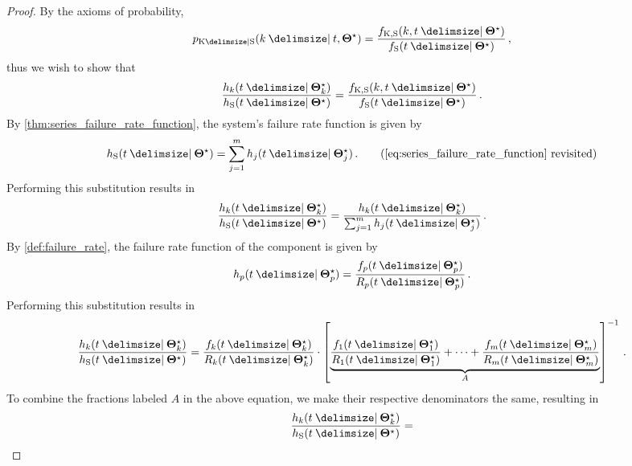 \documentclass[
    11pt,
    extrafontsizes,
    article,
    oldfontcommands,
    final,
    oneside,
    openany,
    hidelinks]{memoir}
\begin{document}
\begin{proof}
By the axioms of probability,
\begin{equation}
    \pmf_{\RV{K} \Given \sv}(k \Given t, \tparam\sysparam) =
    \frac { \pdf_{\RV{K}, \sv}(k, t \Given \tparam{\sysparam}) }
    { \spdf(t \Given \tparam{\sysparam}) }\,,
\end{equation}
thus we wish to show that
\begin{equation}
\label{eq:proof_cor_K_given_S_failure_rate}
    \frac{\haz_k(t \Given \tparam{\sysparam}_k)}{\haz_{\sv}(t \Given \tparam{\sysparam})} =
    \frac   { \pdf_{\RV{K}, \sv}(k, t \Given \tparam{\sysparam}) }
            { \spdf(t \Given \tparam{\sysparam}) }\,.
\end{equation}
By \cref{thm:series_failure_rate_function}, the system's failure rate function is given by
\begin{equation*}
\haz_{\sv}(t \Given \tparam\sysparam) = \sum_{j=1}^{m} \haz_j(t \Given \tparam{\sysparam}_j)\,.
\tag{\ref{eq:series_failure_rate_function} revisited}
\end{equation*}
Performing this substitution results in
\begin{equation}
    \frac{\haz_k(t \Given \tparam{\sysparam}_k)}{\haz_{\sv}(t \Given \tparam{\sysparam})} = \frac{\haz_k(t \Given \tparam{\sysparam}_k)}{\sum_{j=1}^{m} \haz_j(t \Given \tparam{\sysparam}_j) }\,.
\end{equation}
By \cref{def:failure_rate}, the failure rate function of the \pth component is given by
\begin{equation}
    \haz_p(t \Given \tparam{\sysparam}_p) = \frac{\pdf_p(t \Given \tparam{\sysparam}_p)}{\srv_p(t \Given \tparam{\sysparam}_p)}\,.
\end{equation}
Performing this substitution results in
\begin{equation}
    \frac{\haz_k(t \Given \tparam{\sysparam}_k)}{\haz_{\sv}(t \Given \tparam{\sysparam})} = \frac{\pdf_k(t \Given \tparam{\sysparam}_k)}{\srv_k(t \Given \tparam{\sysparam}_k)} \cdot
    \left [
        \underbrace{
            \frac{\pdf_1(t \Given \tparam{\sysparam}_1)}{\srv_1(t \Given \tparam{\sysparam}_1)} + \cdots + \frac{\pdf_m(t \Given \tparam{\sysparam}_m)}{\srv_m(t \Given \tparam{\sysparam}_m)}
        }_{A}
    \right ]^{-1}\,.
\end{equation}
To combine the fractions labeled $A$ in the above equation, we make their respective denominators the same, resulting in
\begin{equation}
    \frac{\haz_k(t \Given \tparam{\sysparam}_k)}{\haz_{\sv}(t \Given \tparam\sysparam)} =

\end{equation}
\end{proof}
\end{document}

